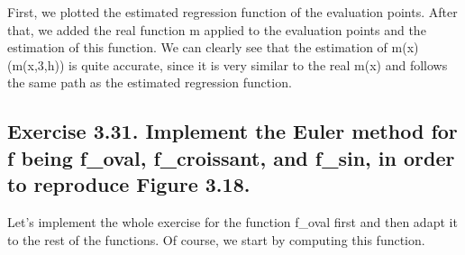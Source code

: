 \documentclass[
]{article}
\begin{document}
First, we plotted the estimated regression function of the evaluation
points. After that, we added the real function m applied to the
evaluation points and the estimation of this function. We can clearly
see that the estimation of m(x) (m(x,3,h)) is quite accurate, since it
is very similar to the real m(x) and follows the same path as the
estimated regression function.

\hypertarget{exercise-3.31.-implement-the-euler-method-for-f-being-f_oval-f_croissant-and-f_sin-in-order-to-reproduce-figure-3.18.}{%
\subsection{Exercise 3.31. Implement the Euler method for f being
f\_oval, f\_croissant, and f\_sin, in order to reproduce Figure
3.18.}\label{exercise-3.31.-implement-the-euler-method-for-f-being-f_oval-f_croissant-and-f_sin-in-order-to-reproduce-figure-3.18.}}

Let's implement the whole exercise for the function f\_oval first and
then adapt it to the rest of the functions. Of course, we start by
computing this function.
\end{document}

